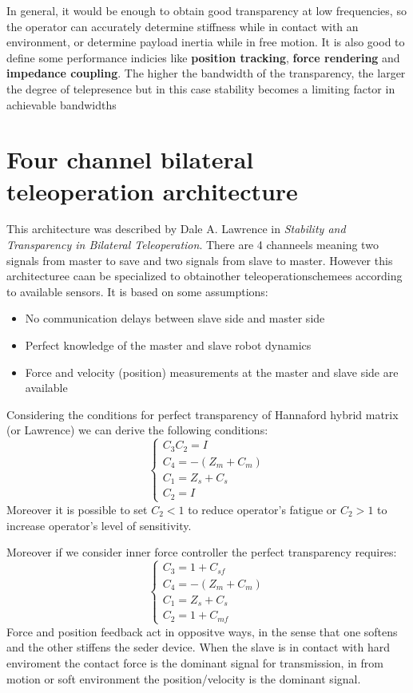 \documentclass[a4paper,12pt]{article}
\begin{document}
In general, it would be enough to obtain good transparency at low frequencies, so the
operator can accurately determine stiffness while in contact with an environment, or
determine payload inertia while in free motion. It is also good to define some performance indicies like \textbf{position tracking}, \textbf{force rendering} and \textbf{impedance coupling}.
The higher the bandwidth of the transparency, the larger the degree of telepresence but in this case stability becomes a limiting factor in achievable bandwidths

\section{Four channel bilateral teleoperation architecture}

This architecture was described by Dale A. Lawrence in \textit{Stability and Transparency in Bilateral Teleoperation}. There are 4 channeels meaning two signals from master to save and two signals from slave to master. However this architecturee caan be specialized to obtainother teleoperationschemees according to available sensors. It is based on some assumptions:
\begin{itemize}
    \item No communication delays between slave side and master side
    \item Perfect knowledge of the master and slave robot dynamics
    \item Force and velocity (position) measurements at the master and slave side are available
\end{itemize}
Considering the conditions for perfect transparency of Hannaford hybrid matrix (or Lawrence) we can derive the following conditions:
\[
\begin{cases}
    C_3C_2 = I\\
    C_4 = -(Z_m + C_m) \\
    C_1 = Z_s + C_s \\
    C_2 = I
\end{cases}
\]
Moreover it is possible to set $C_2 < 1$ to reduce operator's fatigue or $C_2 > 1$ to increase operator's level of sensitivity. 

Moreover if we consider inner force controller the perfect transparency requires:
\[
\begin{cases}
    C_3 = 1 + C_{sf}\\
    C_4 = -(Z_m + C_m) \\
    C_1 = Z_s + C_s \\
    C_2 = 1 + C_{mf}
\end{cases}
\]
Force and position feedback act in oppositve ways, in the sense that one softens and the other stiffens the seder device. When the slave is in contact with hard enviroment the contact force is the dominant signal for transmission, in from motion or soft environment the position/velocity is the dominant signal.
\end{document}
